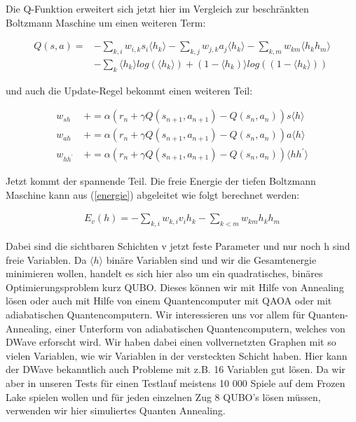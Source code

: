 Die Q-Funktion erweitert sich jetzt hier im Vergleich zur beschränkten Boltzmann Maschine um einen weiteren Term:

\begin{align}
	Q(s,a) =  	&- \sum_{k,i} w_{i,k}s_i \langle h_k \rangle  
				- \sum_{k,j} w_{j,k}a_j \langle h_k \rangle   
				- \sum_{k,m}w_{km} \langle h_k h_m \rangle \label{Qdbm1}   \\  
				&- \sum_{k} \langle h_k \rangle log(\langle h_k \rangle) + (1 -  \langle h_k) \rangle log( (1 - \langle h_k \rangle) )  \label{Qdbm2}
\end{align}

und auch die Update-Regel bekommt einen weiteren Teil:

\begin{align*}
	w_{sh} \: 			&+= \alpha ( r_n + \gamma Q(s_{n+1}, a_{n+1}) -  Q(s_n, a_n) ) s \langle h \rangle \\
	w_{ah} \: 			&+= \alpha ( r_n + \gamma Q(s_{n+1}, a_{n+1}) -  Q(s_n, a_n) ) a \langle h \rangle \\
	w_{hh^{\prime}} \: 	&+= \alpha ( r_n + \gamma Q(s_{n+1}, a_{n+1}) -  Q(s_n, a_n) ) \langle h h^{\prime} \rangle 
\end{align*}

Jetzt kommt der spannende Teil. Die freie Energie der tiefen Boltzmann Maschine kann aus (\ref{energie}) abgeleitet wie folgt berechnet werden:

\begin{align}
	E_v(h) = - \sum_{k,i}w_{k,i}v_ih_k - \sum_{k<m}w_{km}h_kh_m \label{energiedbm}
\end{align}

Dabei sind die sichtbaren Schichten v jetzt feste Parameter und nur noch h sind freie Variablen. Da $\langle h \rangle$ binäre Variablen sind und wir die Gesamtenergie minimieren wollen, handelt es sich hier also um ein quadratisches, binäres Optimierungsproblem kurz QUBO. Dieses können wir mit Hilfe von Annealing lösen oder auch mit Hilfe von einem Quantencomputer mit QAOA oder mit adiabatischen Quantencomputern. Wir interessieren uns vor allem für Quanten-Annealing, einer Unterform von adiabatischen Quantencomputern, welches von DWave erforscht wird. Wir haben dabei einen vollvernetzten Graphen mit so vielen Variablen, wie wir Variablen in der versteckten Schicht haben. Hier kann der DWave bekanntlich auch Probleme mit z.B. 16 Variablen gut lösen. Da wir aber in unseren Tests für einen Testlauf meistens 10 000 Spiele auf dem Frozen Lake spielen wollen und für jeden einzelnen Zug 8 QUBO's lösen müssen, verwenden wir hier simuliertes Quanten Annealing.

